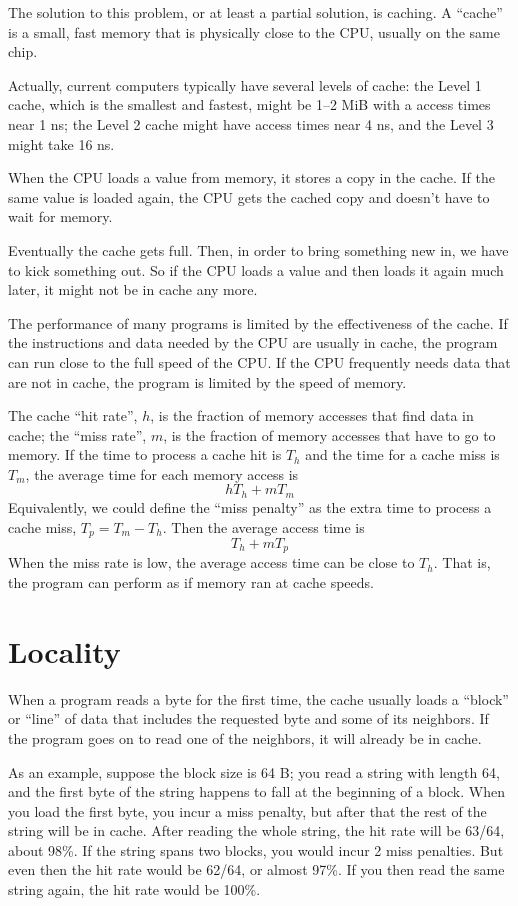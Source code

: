 \documentclass[12pt]{book}
\begin{document}
{The solution to this problem, or at least a partial solution, is
caching.  A ``cache'' is a small, fast memory that is physically close
to the CPU, usually on the same chip.


Actually, current computers typically have several levels of cache: the Level 1 cache, which is the smallest and fastest, might be 1--2 MiB with a access times near 1 ns; the Level 2 cache might have access times near 4 ns, and the Level 3 might take 16 ns.

When the CPU loads a value from memory, it stores a copy in the cache.
If the same value is loaded again, the CPU gets the cached copy
and doesn't have to wait for memory.

Eventually the cache gets full.  Then, in order to bring something
new in, we have to kick something out.  So if the CPU loads a value
and then loads it again much later, it might not be in cache any more.

The performance of many programs is limited by the effectiveness
of the cache.  If the instructions and data needed by the CPU are usually in cache, the program can run close to the full speed of the CPU.  If the CPU
frequently needs data that are not in cache, the program is
limited by the speed of memory.

The cache ``hit rate'', $h$, is the fraction of memory accesses that
find data in cache; the ``miss rate'', $m$, is the fraction of memory
accesses that have to go to memory.  If the time to process a cache
hit is $T_h$ and the time for a cache miss is $T_m$, the average time
for each memory access is
%
\[ h T_h + m T_m \]
%
Equivalently, we could define the ``miss penalty'' as the extra
time to process a cache miss, $T_p = T_m - T_h$.  Then the average access
time is
%
\[ T_h + m T_p \]
%
When the miss rate is low, the average access time can be close to
$T_h$.  That is, the program can perform as if memory ran at
cache speeds.


\section{Locality}

When a program reads a byte for the first time, the cache usually
loads a ``block'' or ``line'' of data that includes the requested
byte and some of its neighbors.  If the program goes on to read one
of the neighbors, it will already be in cache.

As an example, suppose the block size is 64 B;
you read a string with length 64, and the first
byte of the string happens to fall at the beginning of a block.  When
you load the first byte, you incur a miss penalty, but
after that the rest of the string will be in cache.  After
reading the whole string, the hit rate will be 63/64, about 98\%.
If the string spans two blocks, you would incur 2 miss penalties.  But
even then the hit rate would be 62/64, or almost 97\%.  If you then
read the same string again, the hit rate would be 100\%.

}
\end{document}
